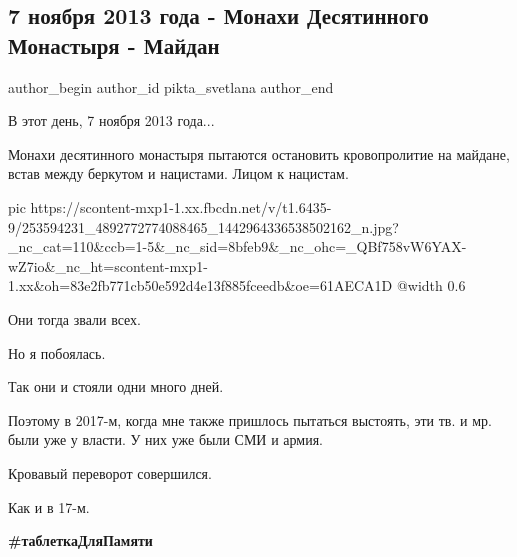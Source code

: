  
 
 
 
 
 
\subsection{7 ноября 2013 года - Монахи Десятинного Монастыря - Майдан}
\label{sec:07_11_2021.fb.pikta_svetlana.1.monahi_maidan}
 
\ifcmt
 author_begin
   author_id pikta_svetlana
 author_end
\fi

В этот день, 7 ноября 2013 года...

Монахи десятинного монастыря пытаются остановить кровопролитие на майдане,
встав между беркутом и нацистами. Лицом к нацистам. 

\ifcmt
  pic https://scontent-mxp1-1.xx.fbcdn.net/v/t1.6435-9/253594231_4892772774088465_1442964336538502162_n.jpg?_nc_cat=110&ccb=1-5&_nc_sid=8bfeb9&_nc_ohc=_QBf758vW6YAX-wZ7io&_nc_ht=scontent-mxp1-1.xx&oh=83e2fb771cb50e592d4e13f885fceedb&oe=61AECA1D
  @width 0.6
\fi

Они тогда звали всех. 

Но я побоялась.

Так они и стояли одни много дней. 

Поэтому в 2017-м, когда мне также пришлось пытаться выстоять, эти тв. и мр.
были уже у власти. У них уже были СМИ и армия. 

Кровавый переворот совершился. 

Как и в 17-м.

\textbf{\#таблеткаДляПамяти}
